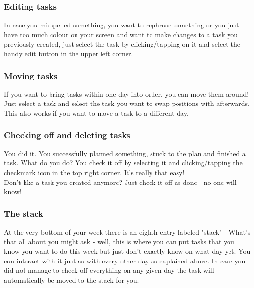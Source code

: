 \subsubsection{Editing tasks}
In case you misspelled something, you want to rephrase something or you just have too much colour on your screen and want to make changes to a task you previously created, just select the task by clicking/tapping on it and select the handy edit button in the upper left corner. 
\subsubsection{Moving tasks}
If you want to bring tasks within one day into order, you can move them around! Just select a task and select the task you want to swap positions with afterwards. 
This also works if you want to move a task to a different day. 
\subsubsection{Checking off and deleting tasks}
You did it. You successfully planned something, stuck to the plan and finished a task. What do you do? You check it off by selecting it and clicking/tapping the checkmark icon in the top right corner. It's really that easy! \\
Don't like a task you created anymore? Just check it off as done - no one will know!
\subsubsection{The stack}
At the very bottom of your week there is an eighth entry labeled "stack" - What's that all about you might ask - well, this is where you can put tasks that you know you want to do this week but just don't exactly know on what day yet.  You can interact with it just as with every other day as explained above.  
In case you did not manage to check off everything on any given day the task will automatically be moved to the stack for you.
